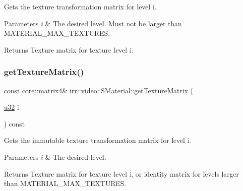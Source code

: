 Gets the texture transformation matrix for level i. 


\begin{DoxyParams}{Parameters}
{\em i} & The desired level. Must not be larger than M\+A\+T\+E\+R\+I\+A\+L\+\_\+\+M\+A\+X\+\_\+\+T\+E\+X\+T\+U\+R\+ES. \\
\hline
\end{DoxyParams}
\begin{DoxyReturn}{Returns}
Texture matrix for texture level i. 
\end{DoxyReturn}
\mbox{\label{classirr_1_1video_1_1SMaterial_a6b0adff4b14c80da0be8e8d600252fcd}} 
\subsubsection{\texorpdfstring{get\+Texture\+Matrix()}{getTextureMatrix()}\hspace{0.1cm}{\footnotesize\ttfamily [2/2]}}
{\footnotesize\ttfamily const \hyperlink{namespaceirr_1_1core_a73fa92e638c5ca97efd72da307cc9b65}{core\+::matrix4}\& irr\+::video\+::\+S\+Material\+::get\+Texture\+Matrix (\begin{DoxyParamCaption}\item[{\hyperlink{namespaceirr_a0416a53257075833e7002efd0a18e804}{u32}}]{i }\end{DoxyParamCaption}) const\hspace{0.3cm}{\ttfamily [inline]}}



Gets the immutable texture transformation matrix for level i. 


\begin{DoxyParams}{Parameters}
{\em i} & The desired level. \\
\hline
\end{DoxyParams}
\begin{DoxyReturn}{Returns}
Texture matrix for texture level i, or identity matrix for levels larger than M\+A\+T\+E\+R\+I\+A\+L\+\_\+\+M\+A\+X\+\_\+\+T\+E\+X\+T\+U\+R\+ES. 
\end{DoxyReturn}
\mbox{\label{classirr_1_1video_1_1SMaterial_aeb4cd5880d7fbf330dc4d5cca0177407}} 
